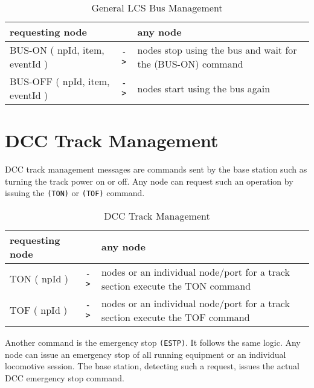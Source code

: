 \begin{table}[ht!]
    \begin{center}
        \caption{General LCS Bus Management}
        \begin{tabular}{|p{}| c |p{}|}
            \toprule
            \textbf{requesting node} & & \textbf{ any node} \\
            \midrule
            BUS-ON ( npId, item, eventId ) & \texttt{->} & nodes stop using the bus and wait for the (BUS-ON) command  \\
            \midrule
            BUS-OFF ( npId, item, eventId ) & \texttt{->} & nodes start using the bus again \\
            \bottomrule
        \end{tabular}
    \end{center}
\end{table}

\section{DCC Track Management}

DCC track management messages are commands sent by the base station such as turning the track power on or off. Any node can request such an operation by issuing the \texttt{(TON)} or \texttt{(TOF)} command.

\begin{table}[ht!]
    \begin{center}
        \caption{DCC Track Management}
        \begin{tabular}{|p{}| c |p{}|}
            \toprule
            \textbf{requesting node} & & \textbf{ any node} \\
            \midrule
            TON ( npId ) & \texttt{->} & nodes or an individual node/port for a track section execute the TON command  \\
            \midrule
            TOF ( npId ) & \texttt{->} & nodes or an individual node/port for a track section execute the TOF command \\
            \bottomrule
        \end{tabular}
    \end{center}
\end{table}

Another command is the emergency stop \texttt{(ESTP)}. It follows the same logic. Any node can issue an emergency stop of all running equipment or an individual locomotive session. The base station, detecting such a request, issues the actual DCC emergency stop command. 

